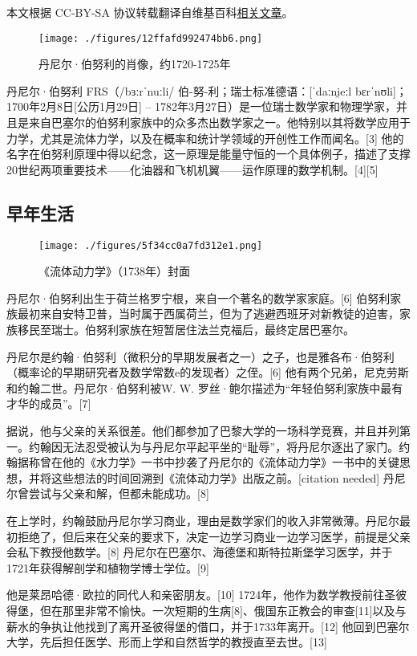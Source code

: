 
本文根据 CC-BY-SA 协议转载翻译自维基百科\href{https://en.wikipedia.org/wiki/Daniel_Bernoulli}{相关文章}。

\begin{figure}[ht]
\centering
\texttt{[image: ./figures/12ffafd992474bb6.png]}
\caption{丹尼尔·伯努利的肖像，约1720-1725年} \label{fig_BNL_1}
\end{figure}
丹尼尔·伯努利 FRS（/bɜːrˈnuːli/ 伯-努-利；瑞士标准德语：[ˈdaːni̯eːl bɛrˈnʊli]；1700年2月8日[公历1月29日] – 1782年3月27日）是一位瑞士数学家和物理学家，并且是来自巴塞尔的伯努利家族中的众多杰出数学家之一。他特别以其将数学应用于力学，尤其是流体力学，以及在概率和统计学领域的开创性工作而闻名。[3] 他的名字在伯努利原理中得以纪念，这一原理是能量守恒的一个具体例子，描述了支撑20世纪两项重要技术——化油器和飞机机翼——运作原理的数学机制。[4][5]
\subsection{早年生活}
\begin{figure}[ht]
\centering
\texttt{[image: ./figures/5f34cc0a7fd312e1.png]}
\caption{《流体动力学》（1738年）封面} \label{fig_BNL_2}
\end{figure}
丹尼尔·伯努利出生于荷兰格罗宁根，来自一个著名的数学家家庭。[6] 伯努利家族最初来自安特卫普，当时属于西属荷兰，但为了逃避西班牙对新教徒的迫害，家族移民至瑞士。伯努利家族在短暂居住法兰克福后，最终定居巴塞尔。

丹尼尔是约翰·伯努利（微积分的早期发展者之一）之子，也是雅各布·伯努利（概率论的早期研究者及数学常数e的发现者）之侄。[6] 他有两个兄弟，尼克劳斯和约翰二世。丹尼尔·伯努利被W. W. 罗丝·鲍尔描述为“年轻伯努利家族中最有才华的成员”。[7]

据说，他与父亲的关系很差。他们都参加了巴黎大学的一场科学竞赛，并且并列第一。约翰因无法忍受被认为与丹尼尔平起平坐的“耻辱”，将丹尼尔逐出了家门。约翰据称曾在他的《水力学》一书中抄袭了丹尼尔的《流体动力学》一书中的关键思想，并将这些想法的时间回溯到《流体动力学》出版之前。[citation needed] 丹尼尔曾尝试与父亲和解，但都未能成功。[8]

在上学时，约翰鼓励丹尼尔学习商业，理由是数学家们的收入非常微薄。丹尼尔最初拒绝了，但后来在父亲的要求下，决定一边学习商业一边学习医学，前提是父亲会私下教授他数学。[8] 丹尼尔在巴塞尔、海德堡和斯特拉斯堡学习医学，并于1721年获得解剖学和植物学博士学位。[9]

他是莱昂哈德·欧拉的同代人和亲密朋友。[10] 1724年，他作为数学教授前往圣彼得堡，但在那里非常不愉快。一次短期的生病[8]、俄国东正教会的审查[11]以及与薪水的争执让他找到了离开圣彼得堡的借口，并于1733年离开。[12] 他回到巴塞尔大学，先后担任医学、形而上学和自然哲学的教授直至去世。[13]

